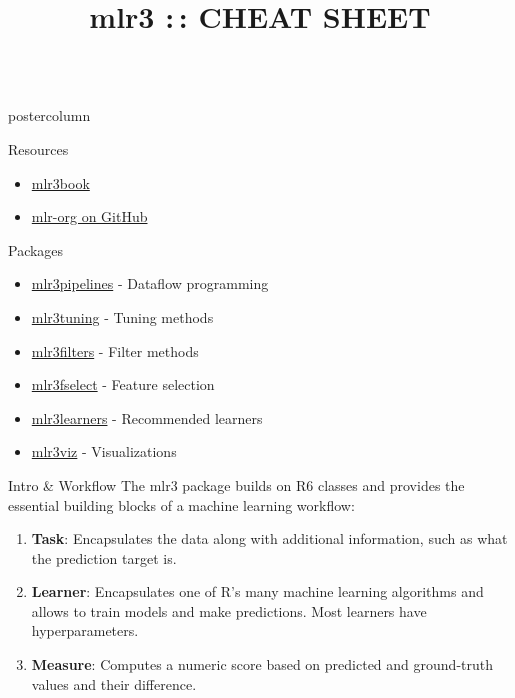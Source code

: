 \documentclass{beamer}
\title{mlr3 :\,: CHEAT SHEET} %
\newlength{\columnheight} %
\begin{document}
\begin{frame}[fragile]{}
	\begin{columns}
		\begin{column}{.245\textwidth}
			\begin{beamercolorbox}[center]{postercolumn}
				\begin{minipage}{.98\textwidth}
					\parbox[t][\columnheight]{\textwidth}{
						\begin{myblock}{Resources}
							\begin{itemize}
								\item \href{https://mlr3book.mlr-org.com/index.html}{mlr3book}
								\item \href{https://github.com/mlr-org}{mlr-org on GitHub}
							\end{itemize}
						\end{myblock}
						\begin{myblock}{Packages}
							\vfill
							\begin{itemize}
								\item \href{https://github.com/mlr-org/mlr3pipelines}{mlr3pipelines} - Dataflow programming
								\item \href{https://github.com/mlr-org/mlr3tuning}{mlr3tuning} - Tuning methods
								\item \href{https://github.com/mlr-org/mlr3filters}{mlr3filters} - Filter methods
								\item \href{https://github.com/mlr-org/mlr3fselect}{mlr3fselect} - Feature selection
								\item \href{https://github.com/mlr-org/mlr3learners}{mlr3learners} - Recommended learners
								\item \href{https://github.com/mlr-org/mlr3viz}{mlr3viz} - Visualizations
							\end{itemize}
						\end{myblock}
						\begin{myblock}{Intro \& Workflow}
							The mlr3 package builds on R6 classes and provides the essential building
							blocks of a machine learning workflow:
							\begin{enumerate}
								\item \textbf{Task}: Encapsulates the data along with additional information, such as what the prediction target is.
								\item \textbf{Learner}: Encapsulates one of R's many machine learning algorithms and allows to train models and make predictions. Most learners have hyperparameters.
								\item \textbf{Measure}: Computes a numeric score based on predicted and ground-truth values and their difference.

\end{enumerate}
\end{myblock}}
\end{minipage}
\end{beamercolorbox}
\end{column}
\end{columns}
\end{frame}
\end{document}
